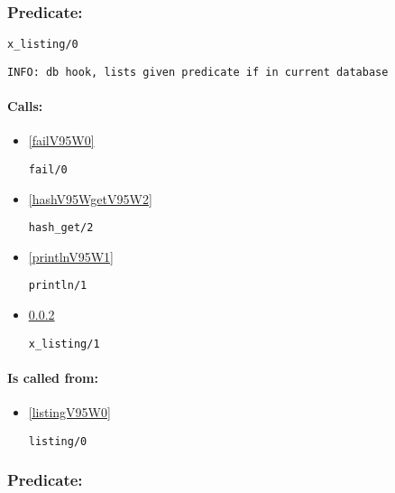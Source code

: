 \subsubsection{Predicate:} \label{xV95WlistingV95W0}

\begin{verbatim}
x_listing/0
\end{verbatim}

{\small \begin{verbatim}
INFO: db hook, lists given predicate if in current database

\end{verbatim}}
\paragraph{Calls:} 
\begin{itemize}
\item \ref{failV95W0} 
\begin{verbatim}
fail/0
\end{verbatim}

\item \ref{hashV95WgetV95W2} 
\begin{verbatim}
hash_get/2
\end{verbatim}

\item \ref{printlnV95W1} 
\begin{verbatim}
println/1
\end{verbatim}

\item \ref{xV95WlistingV95W1} 
\begin{verbatim}
x_listing/1
\end{verbatim}

\end{itemize}
\paragraph{Is called from:} 
\begin{itemize}
\item \ref{listingV95W0} 
\begin{verbatim}
listing/0
\end{verbatim}

\end{itemize}

\subsubsection{Predicate:} \label{xV95WlistingV95W1}

